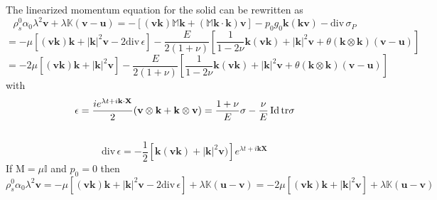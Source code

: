 \documentclass[12pt]{article}
\numberwithin{theorem}{section}
\def\div{\mbox{div}\,}
\begin{document}
The linearized momentum equation for the solid can be rewritten as
\[\rho_s^0 \alpha_0 \lambda^2 \mathbf{v} + \lambda \mathbb{K}(\mathbf{v} - \mathbf{u}) = 
- [(\mathbf{v}\mathbf{k})\mathbb{M}\mathbf{k} + (\mathbb{M}\mathbf{k}\cdot\mathbf{k})\mathbf{v}] 
- p_0 g_0 \mathbf{k(kv)} - \div \sigma_P\]
\[= - \mu[(\mathbf{v}\mathbf{k})\mathbf{k} + |\mathbf{k}|^2\mathbf{v} - 2\div \epsilon] - \frac{E}{2(1+\nu)} \left[\frac{1}{1-2\nu}\mathbf{k}(\mathbf{vk}) + |\mathbf{k}|^2\mathbf{v} +\theta (\mathbf{k}\otimes\mathbf{k})(\mathbf{v-u}) \right]\]
\[ =
- 2\mu[(\mathbf{v}\mathbf{k})\mathbf{k} + |\mathbf{k}|^2\mathbf{v} ] - \frac{E}{2(1+\nu)} \left[\frac{1}{1-2\nu}\mathbf{k}(\mathbf{vk}) + |\mathbf{k}|^2\mathbf{v} +\theta (\mathbf{k}\otimes\mathbf{k})(\mathbf{v-u}) \right]\]
with
\begin{equation} 
\epsilon =\frac{ie^{\lambda t + i\mathbf{k\cdot X}}}{2}(\mathbf{v\otimes k + k\otimes v})= \frac{1+\nu}{E}\sigma - \frac{\nu}{E} \,  {\rm Id} \,  {\rm tr} \sigma
\label{epsilon_disturbances_lambda}
\end{equation}
\\
\[\div  \epsilon =
-\frac12 [\mathbf{k}(\mathbf{vk}) + |\mathbf{k}|^2\mathbf{v})]e^{\lambda t + i\mathbf{kX}}\]
If $\mathrm{M} = \mu \mathbb{I}$ and $p_0=0$ then
\[\rho_s^0 \alpha_0 \lambda^2 \mathbf{v} = 
- \mu[(\mathbf{v}\mathbf{k})\mathbf{k} + |\mathbf{k}|^2\mathbf{v} - 2\div \epsilon]  + \lambda \mathbb{K}(\mathbf{u} - \mathbf{v}) =
- 2\mu[(\mathbf{v}\mathbf{k})\mathbf{k} + |\mathbf{k}|^2\mathbf{v} ]  + \lambda \mathbb{K}(\mathbf{u} - \mathbf{v})\]
\end{document}
